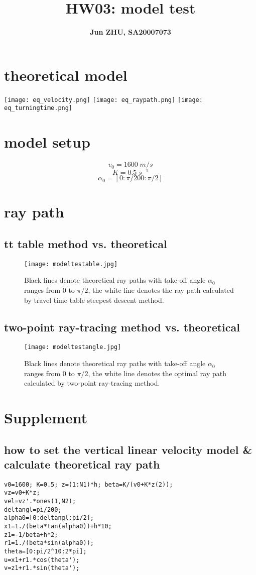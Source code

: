 \documentclass{article}
\title{\textbf{HW03: model test}}
\author{\textbf{Jun ZHU, SA20007073}}
\begin{document}
\maketitle
\section{theoretical model}
\texttt{[image: eq\_velocity.png]}\newline
\texttt{[image: eq\_raypath.png]}\newline
\texttt{[image: eq\_turningtime.png]}
\section{model setup}
$$v_0=1600\;m/s$$
$$K=0.5\;s^{-1}$$
$$\alpha _{0}=[0:\pi/200:\pi/2]$$
\section{ray path}
\subsection{tt table method vs. theoretical}
\begin{figure}[H]
  \centering
  \texttt{[image: modeltestable.jpg]}
  \caption{Black lines denote theoretical ray paths with take-off angle $\alpha _0$ ranges from 0 to $\pi/2$, the white line denotes the ray path calculated by travel time table steepest descent method.}
\end{figure}
\subsection{two-point ray-tracing method vs. theoretical}
\begin{figure}[H]
  \centering
  \texttt{[image: modeltestangle.jpg]}
  \caption{Black lines denote theoretical ray paths with take-off angle $\alpha _0$ ranges from 0 to $\pi/2$, the white line denotes the optimal ray path calculated by two-point ray-tracing method.}
\end{figure}
\section{Supplement}
\subsection{how to set the vertical linear velocity model \& calculate theoretical ray path}
\begin{lstlisting}
v0=1600; K=0.5; z=(1:N1)*h; beta=K/(v0+K*z(2));
vz=v0+K*z;
vel=vz'.*ones(1,N2);
deltangl=pi/200;
alpha0=[0:deltangl:pi/2];
x1=1./(beta*tan(alpha0))+h*10;
z1=-1/beta+h*2;
r1=1./(beta*sin(alpha0));
theta=[0:pi/2^10:2*pi];
u=x1+r1.*cos(theta');
v=z1+r1.*sin(theta');
\end{lstlisting}
\end{document}
